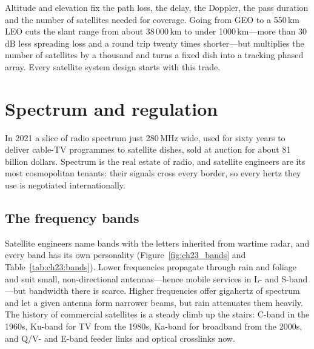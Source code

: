 \begin{keyidea}
Altitude and elevation fix the path loss, the delay, the Doppler, the pass duration and the
number of satellites needed for coverage. Going from GEO to a 550\,km LEO cuts the slant range
from about 38\,000\,km to under 1000\,km---more than 30\,dB less spreading loss and a round trip
twenty times shorter---but multiplies the number of satellites by a thousand and turns a fixed
dish into a tracking phased array. Every satellite system design starts with this trade.
\end{keyidea}

\section{Spectrum and regulation}
\label{sec:ch23:spectrum}

In 2021 a slice of radio spectrum just 280\,MHz wide, used for sixty years to deliver cable-TV
programmes to satellite dishes, sold at auction for about 81 billion dollars. Spectrum is the
real estate of radio, and satellite engineers are its most cosmopolitan tenants: their signals
cross every border, so every hertz they use is negotiated internationally.

\subsection{The frequency bands}

Satellite engineers name bands with the letters inherited from wartime radar, and every band
has its own personality (Figure~\ref{fig:ch23_bands} and Table~\ref{tab:ch23:bands}). Lower
frequencies propagate through rain and foliage and suit small, non-directional antennas---hence
mobile services in L- and S-band---but bandwidth there is scarce. Higher frequencies offer
gigahertz of spectrum and let a given antenna form narrower beams, but rain attenuates them
heavily. The history of commercial satellites is a steady climb up the stairs: C-band in the
1960s, Ku-band for TV from the 1980s, Ka-band for broadband from the 2000s, and Q/V- and E-band
feeder links and optical crosslinks now.





